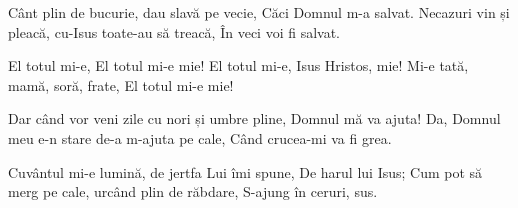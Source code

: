 \beginverse
Cânt plin de bucurie, dau slavă pe vecie,
Căci Domnul m-a salvat.
Necazuri vin și pleacă, cu-Isus toate-au să treacă,
În veci voi fi salvat.
\endverse

\beginchorus
El totul mi-e, El totul mi-e mie!
El totul mi-e, Isus Hristos, mie!
Mi-e tată, mamă, soră, frate,
El totul mi-e mie!
\endchorus

\beginverse
Dar când vor veni zile cu nori și umbre pline,
Domnul mă va ajuta!
Da, Domnul meu e-n stare de-a m-ajuta pe cale,
Când crucea-mi va fi grea.
\endverse

\beginverse
Cuvântul mi-e lumină, de jertfa Lui îmi spune,
De harul lui Isus;
Cum pot să merg pe cale, urcând plin de răbdare,
S-ajung în ceruri, sus.
\endverse
\endsong